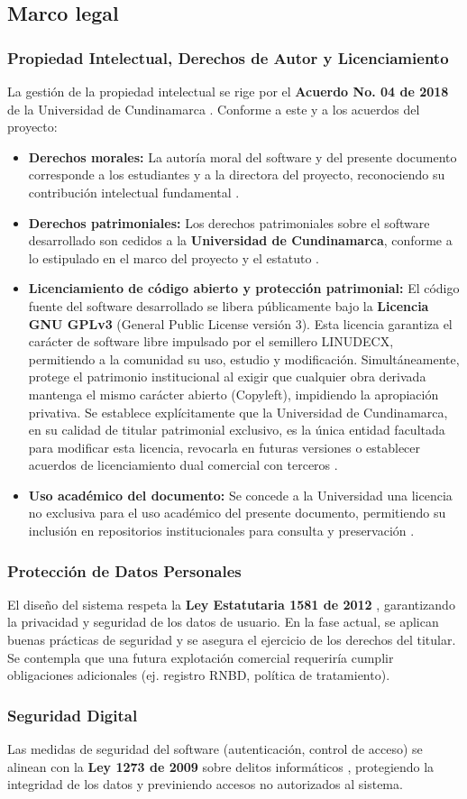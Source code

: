 \subsection{Marco legal}
\label{subsec:marco_legal}

\subsubsection{Propiedad Intelectual, Derechos de Autor y Licenciamiento}
La gestión de la propiedad intelectual se rige por el \textbf{Acuerdo No. 04 de 2018} de la Universidad de Cundinamarca . Conforme a este y a los acuerdos del proyecto:
\begin{itemize}
    \item \textbf{Derechos morales:} La autoría moral del software y del presente documento corresponde a los estudiantes y a la directora del proyecto, reconociendo su contribución intelectual fundamental .
    \item \textbf{Derechos patrimoniales:} Los derechos patrimoniales sobre el software desarrollado son cedidos a la \textbf{Universidad de Cundinamarca}, conforme a lo estipulado en el marco del proyecto y el estatuto .
    \item \textbf{Licenciamiento de código abierto y protección patrimonial:} El código fuente del software desarrollado se libera públicamente bajo la \textbf{Licencia GNU GPLv3} (General Public License versión 3). Esta licencia garantiza el carácter de software libre impulsado por el semillero LINUDECX, permitiendo a la comunidad su uso, estudio y modificación. Simultáneamente, protege el patrimonio institucional al exigir que cualquier obra derivada mantenga el mismo carácter abierto (Copyleft), impidiendo la apropiación privativa. Se establece explícitamente que la Universidad de Cundinamarca, en su calidad de titular patrimonial exclusivo, es la única entidad facultada para modificar esta licencia, revocarla en futuras versiones o establecer acuerdos de licenciamiento dual comercial con terceros .
    \item \textbf{Uso académico del documento:} Se concede a la Universidad una licencia no exclusiva para el uso académico del presente documento, permitiendo su inclusión en repositorios institucionales para consulta y preservación .
\end{itemize}

\subsubsection{Protección de Datos Personales}
El diseño del sistema respeta la \textbf{Ley Estatutaria 1581 de 2012} , garantizando la privacidad y seguridad de los datos de usuario. En la fase actual, se aplican buenas prácticas de seguridad y se asegura el ejercicio de los derechos del titular. Se contempla que una futura explotación comercial requeriría cumplir obligaciones adicionales (ej. registro RNBD, política de tratamiento).

\subsubsection{Seguridad Digital}
Las medidas de seguridad del software (autenticación, control de acceso) se alinean con la \textbf{Ley 1273 de 2009} sobre delitos informáticos , protegiendo la integridad de los datos y previniendo accesos no autorizados al sistema.